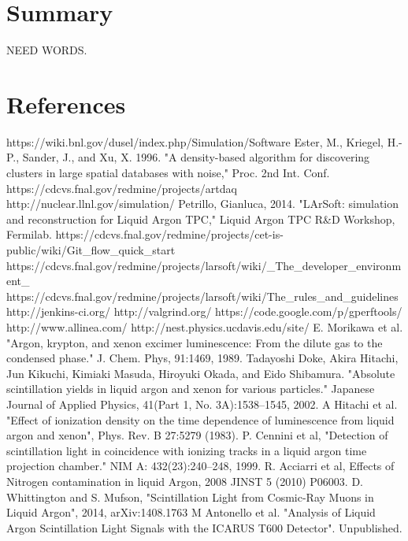 \documentclass[12pt]{elsarticle}
\begin{document}
\section{Summary}
NEED WORDS.
\section{References}

\begin{thebibliography}{99}
 https://wiki.bnl.gov/dusel/index.php/Simulation/Software
 Ester, M., Kriegel, H.-P., Sander, J., and Xu, X. 1996. "A density-based algorithm for discovering clusters in large spatial databases with noise," Proc. 2nd Int. Conf.
 https://cdcvs.fnal.gov/redmine/projects/artdaq
 http://nuclear.llnl.gov/simulation/
 Petrillo, Gianluca, 2014. "LArSoft: simulation and reconstruction for Liquid Argon TPC," Liquid Argon TPC R\&D Workshop, Fermilab.
 https://cdcvs.fnal.gov/redmine/projects/cet-is-public/wiki/Git\_flow\_quick\_start
 https://cdcvs.fnal.gov/redmine/projects/larsoft/wiki/\_The\_developer\_environment\_
 https://cdcvs.fnal.gov/redmine/projects/larsoft/wiki/The\_rules\_and\_guidelines
 http://jenkins-ci.org/
 http://valgrind.org/
 https://code.google.com/p/gperftools/
 http://www.allinea.com/
 http://nest.physics.ucdavis.edu/site/
 E. Morikawa et al. "Argon, krypton, and xenon excimer luminescence: From the dilute gas to the condensed phase." J. Chem. Phys, 91:1469, 1989.
 Tadayoshi Doke, Akira Hitachi, Jun Kikuchi, Kimiaki Masuda, Hiroyuki Okada, and Eido Shibamura. "Absolute scintillation yields in liquid argon and xenon for various particles." Japanese Journal of Applied Physics, 41(Part 1, No. 3A):1538–1545, 2002.
 A Hitachi et al. "Effect of ionization density on the time dependence of luminescence from liquid argon and xenon", Phys. Rev. B 27:5279 (1983). P. Cennini et al, "Detection of scintillation light in coincidence with ionizing tracks in a liquid argon time projection chamber." NIM A: 432(23):240–248, 1999.  R. Acciarri et al, Effects of Nitrogen contamination in liquid Argon, 2008 JINST 5 (2010) P06003.  D. Whittington and S. Mufson, "Scintillation Light from Cosmic-Ray Muons in Liquid Argon", 2014, arXiv:1408.1763
 M Antonello et al.  "Analysis of Liquid Argon Scintillation Light Signals with the ICARUS T600 Detector".  Unpublished.

\end{thebibliography}
\end{document}
